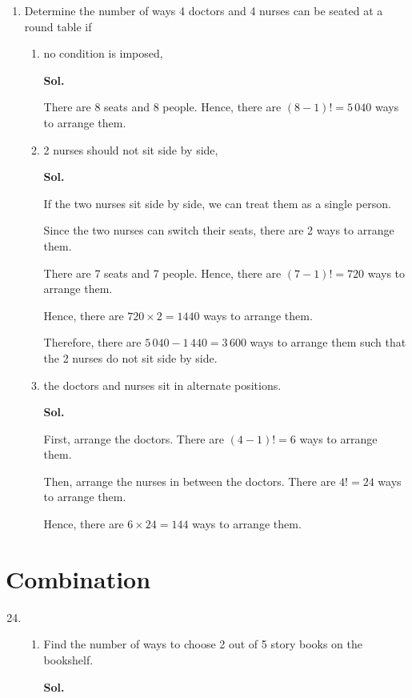 \documentclass{report}
\newcommand{\sol}[1]{

      \noindent \textbf{Sol.}
}
\def\eos{\quad\hbox{\rlap{\hbox{\vrule depth 1.5pt height 2.6mm width 0.2mm \hskip 1mm \vrule height 2.6mm width 0.2mm}}{\vbox{\hrule height 0.2mm width 1.4mm \vskip 2.8mm \hrule depth 1.5pt height -0.35mm width 1.2mm}}}}
\begin{document}
\begin{multicols*}{2}
\begin{enumerate}
            \item Determine the number of ways 4 doctors and 4 nurses can be seated at a round
                  table if
                  \begin{enumerate}
                        \item no condition is imposed, \sol{}

                              There are 8 seats and 8 people. Hence, there are $(8-1)! = 5\,040$ ways to
                              arrange them. $\eos$

                        \item 2 nurses should not sit side by side,
                              \sol{}

                              If the two nurses sit side by side, we can treat them as a single person.

                              Since the two nurses can switch their seats, there are 2 ways to arrange them.

                              There are 7 seats and 7 people. Hence, there are $(7-1)! = 720$ ways to arrange
                              them.

                              Hence, there are $720 \times 2 = 1440$ ways to arrange them.

                              Therefore, there are $5\,040 - 1\,440 = 3\,600$ ways to arrange them such that
                              the 2 nurses do not sit side by side. $\eos$

                        \item the doctors and nurses sit in alternate positions. \sol{}

                              First, arrange the doctors. There are $(4-1)! = 6$ ways to arrange them.

                              Then, arrange the nurses in between the doctors. There are $4! = 24$ ways to
                              arrange them.

                              Hence, there are $6 \times 24 = 144$ ways to arrange them. $\eos$
                  \end{enumerate}

      \end{enumerate}
      \section{Combination}
      \begin{enumerate}
            \setcounter{enumi}{23}
            \item \begin{enumerate}
                        \item Find the number of ways to choose 2 out of 5 story books on the bookshelf.
                              \sol{}


\end{enumerate}
\end{enumerate}
\end{multicols*}
\end{document}
